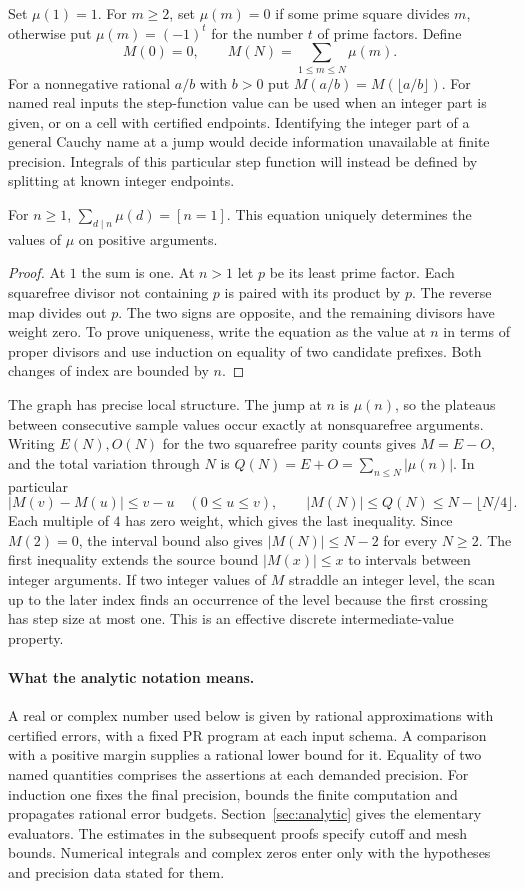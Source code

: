 Set $\mu(1)=1$. For $m\ge2$, set $\mu(m)=0$ if some prime square divides $m$, otherwise put $\mu(m)=(-1)^t$ for the number $t$ of prime factors. Define
\[
 M(0)=0,\qquad M(N)=\sum_{1\le m\le N}\mu(m).
\]
For a nonnegative rational $a/b$ with $b>0$ put $M(a/b)=M(\lfloor a/b\rfloor)$. For named real inputs the step-function value can be used when an integer part is given, or on a cell with certified endpoints. Identifying the integer part of a general Cauchy name at a jump would decide information unavailable at finite precision. Integrals of this particular step function will instead be defined by splitting at known integer endpoints.

\begin{lemma}\label{lem:cancel}
For $n\ge1$, $\displaystyle\sum_{d\mid n}\mu(d)=[n=1]$. This equation uniquely determines the values of $\mu$ on positive arguments.
\end{lemma}
\begin{proof}
At $1$ the sum is one. At $n>1$ let $p$ be its least prime factor. Each squarefree divisor not containing $p$ is paired with its product by $p$. The reverse map divides out $p$. The two signs are opposite, and the remaining divisors have weight zero. To prove uniqueness, write the equation as the value at $n$ in terms of proper divisors and use induction on equality of two candidate prefixes. Both changes of index are bounded by $n$.
\end{proof}

The graph has precise local structure. The jump at $n$ is $\mu(n)$, so the plateaus between consecutive sample values occur exactly at nonsquarefree arguments. Writing $E(N),O(N)$ for the two squarefree parity counts gives $M=E-O$, and the total variation through $N$ is $Q(N)=E+O=\sum_{n\le N}|\mu(n)|$. In particular
\[
 |M(v)-M(u)|\le v-u \quad(0\le u\le v),\qquad
 |M(N)|\le Q(N)\le N-\lfloor N/4\rfloor.
\]
Each multiple of $4$ has zero weight, which gives the last inequality. Since $M(2)=0$, the interval bound also gives $|M(N)|\le N-2$ for every $N\ge2$. The first inequality extends the source bound $|M(x)|\le x$ to intervals between integer arguments. If two integer values of $M$ straddle an integer level, the scan up to the later index finds an occurrence of the level because the first crossing has step size at most one. This is an effective discrete intermediate-value property.

\paragraph{What the analytic notation means.}
A real or complex number used below is given by rational approximations with certified errors, with a fixed PR program at each input schema. A comparison with a positive margin supplies a rational lower bound for it. Equality of two named quantities comprises the assertions at each demanded precision. For induction one fixes the final precision, bounds the finite computation and propagates rational error budgets. Section~\ref{sec:analytic} gives the elementary evaluators. The estimates in the subsequent proofs specify cutoff and mesh bounds. Numerical integrals and complex zeros enter only with the hypotheses and precision data stated for them.

